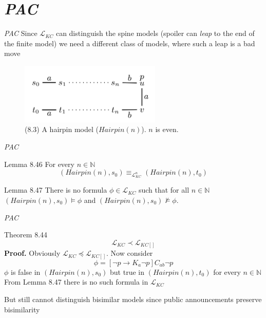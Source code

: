 \documentclass{beamer}
\newcommand{\lang}{\mathcal{L}}
\begin{document}
\section*{\textit{PAC}}

\begin{frame}{\textit{PAC}}
	Since $\lang_{KC}$ can distinguish the spine models (spoiler can \textit{leap} to the end of the finite model) we need a different class of models, where such a leap is a bad move \pause
	\begin{figure}[h]
		\includegraphics[width=0.6\textwidth]{figure_8_3_hairpin_model}
		\caption{(8.3) A hairpin model ($Hairpin(n)$). $n$ is even.}
	\end{figure}
\end{frame}

\begin{frame}{\textit{PAC}}
	\begin{block}{Lemma 8.46}
		For every $n \in \mathbb{N}$
		\[(Hairpin(n),s_0) \equiv_{\lang_{KC}^n} (Hairpin(n),t_0)\]
	\end{block} \pause
	\begin{block}{Lemma 8.47}
		There is no formula $\phi \in \lang_{KC}$ such that for all $n \in \mathbb{N}$\\
		$(Hairpin(n),s_0) \models \phi$ and $(Hairpin(n),s_0) \not\models \phi$.
	\end{block}
\end{frame}

\begin{frame}{\textit{PAC}}
	\begin{block}{Theorem 8.44}
		\[\lang_{KC} \prec \lang_{KC[]}\] \pause
		\textbf{Proof.} Obviously $\lang_{KC} \preceq \lang_{KC[]}$.
		Now consider
		\[\phi = [\neg p \rightarrow K_a \neg p] C_{ab} \neg p\]
		$\phi$ is false in $(Hairpin(n),s_0)$ but true in $(Hairpin(n),t_0)$ for every $n \in \mathbb{N}$
		\\[4pt]
		From Lemma 8.47 there is no such formula in $\lang_{KC}$
	\end{block} \pause
	But still cannot distinguish bisimilar models since public announcements preserve bisimilarity
\end{frame}
\end{document}
